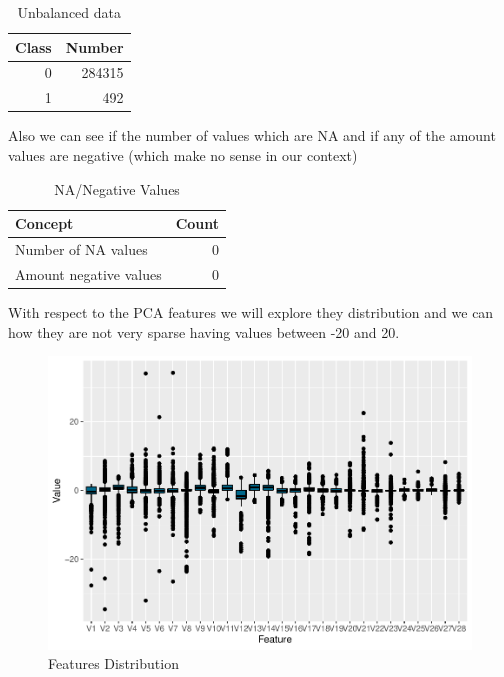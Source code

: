 \documentclass[
]{article}
\begin{document}
\begin{table}[!h]

\caption{\label{tab:no_obs}Unbalanced data}
\centering
\fontsize{10}{12}\selectfont
\begin{tabular}[t]{rr}
\toprule
Class & Number\\
\midrule
0 & 284315\\
1 & 492\\
\bottomrule
\end{tabular}
\end{table}

Also we can see if the number of values which are NA and if any of the
amount values are negative (which make no sense in our context)

\begin{table}[!h]

\caption{\label{tab:NA_values}NA/Negative Values}
\centering
\fontsize{10}{12}\selectfont
\begin{tabular}[t]{lr}
\toprule
Concept & Count\\
\midrule
Number of NA values & 0\\
Amount negative values & 0\\
\bottomrule
\end{tabular}
\end{table}

With respect to the PCA features we will explore they distribution and
we can how they are not very sparse having values between -20 and 20.

\begin{figure}[H]

{\centering \includegraphics[width=0.7\linewidth]{fraudDetectionReport_files/figure-latex/features_distribution-1} 

}

\caption{Features Distribution}\label{fig:features_distribution}
\end{figure}
\end{document}
